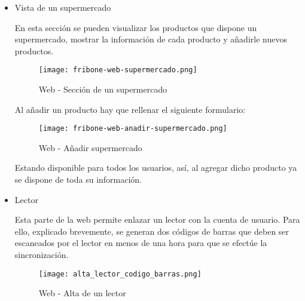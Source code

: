 \begin{itemize}
\begin{itemize}
                \item Vista de un supermercado

                    En esta sección se pueden visualizar los productos que dispone un supermercado, mostrar la información de cada producto y añadirle nuevos productos.

                    \begin{figure}[H]
                        \centering
                        \texttt{[image: fribone-web-supermercado.png]}
                        \caption{Web - Sección de un supermercado}\label{fig:fribone-web-supermercado}
                    \end{figure}

                    Al añadir un producto hay que rellenar el siguiente formulario:

                    \begin{figure}[H]
                        \centering
                        \texttt{[image: fribone-web-anadir-supermercado.png]}
                        \caption{Web - Añadir supermercado}\label{fig:fribone-web-anadir-supermercado}
                    \end{figure}

                    Estando disponible para todos los usuarios, así, al agregar dicho producto ya se dispone de toda su información.

                \item Lector

                    Esta parte de la web permite enlazar un lector con la cuenta de usuario. Para ello, explicado brevemente, se generan dos códigos de barras que deben ser escaneados por el lector en menos de una hora para que se efectúe la sincronización.

                    \begin{figure}[H]
                        \centering
                        \texttt{[image: alta\_lector\_codigo\_barras.png]}
                        \caption{Web - Alta de un lector}\label{fig:fribone-web-alta-lector-codigo-barras}
                    \end{figure}
            \end{itemize}
    \end{itemize}